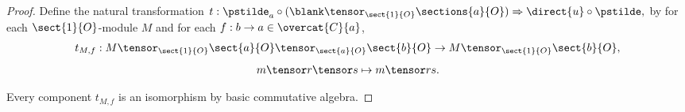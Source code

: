 
\begin{proof}
Define the natural transformation
$t: \pstilde_a \circ (\blank \tensor_{\sect{1}{O}} \sections{a}{O}) \Rightarrow \direct{u} \circ \pstilde,$
by 
for each $\sect{1}{O}$-module $M$
and for each $f:b\rightarrow a\in \overcat{C}{a}$,
\[t_{M,f}: M \tensor_{\sect{1}{O}} \sect{a}{O} \tensor_{\sect{a}{O}} \sect{b}{O}  
	\rightarrow  M \tensor_{\sect{1}{O}} \sect{b}{O},\]
\[m\tensor r \tensor s \mapsto m \tensor rs.\]

Every component $t_{M,f}$ is an isomorphism by basic commutative algebra.
\end{proof}